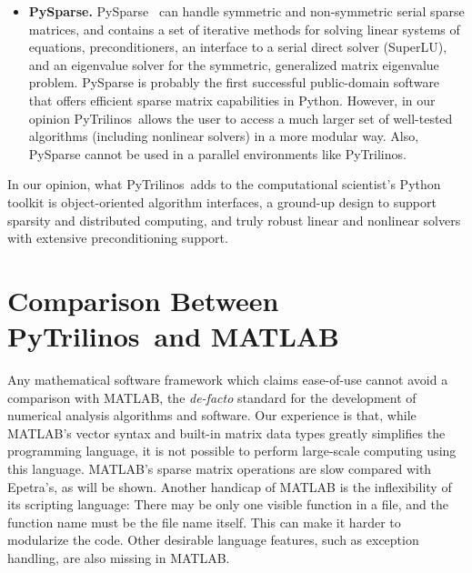 \documentclass[acmtocl]{acmtrans2m}
\newcommand{\PyTrilinos}{{PyTrilinos}}
\begin{document}
\begin{itemize}
  Regarding the serial dense linear algebra modules, both SciPy and
  \PyTrilinos\ define interfaces to optimized LAPACK and BLAS
  routines. However, \PyTrilinos\ offers a wide variety of tools to
  create and use distributed sparse matrices and vectors not supported
  by SciPy.  In our experience, the SciPy capabilities to manage
  sparse matrices are quite limited.  For example, SciPy offers a
  wrapper for one sparse serial direct solver, SuperLU, while
  \PyTrilinos\ can interface with several serial and parallel direct
  solvers through the Amesos module.  In our experience, the nonlinear
  module of SciPy can be used to solve only limited-size problems,
  while the algorithms provided by the NOX modules have been used to
  solve nonlinear PDE problems with up to hundreds of millions of
  unknowns.

\item {\bf PySparse.}  PySparse~\cite{broker05using} can handle
  symmetric and non-symmetric serial sparse matrices, and contains a
  set of iterative methods for solving linear systems of equations,
  preconditioners, an interface to a serial direct solver (SuperLU),
  and an eigenvalue solver for the symmetric, generalized matrix
  eigenvalue problem.  PySparse is probably the first successful
  public-domain software that offers efficient sparse matrix
  capabilities in Python.  However, in our opinion \PyTrilinos\ allows
  the user to access a much larger set of well-tested algorithms
  (including nonlinear solvers) in a more modular way.  Also, PySparse
  cannot be used in a parallel environments like \PyTrilinos.

\end{itemize}

In our opinion, what \PyTrilinos\ adds to the computational scientist's
Python toolkit is object-oriented algorithm interfaces, a ground-up
design to support sparsity and distributed computing, and truly robust
linear and nonlinear solvers with extensive preconditioning support.

\section{Comparison Between \PyTrilinos\ and MATLAB}
\label{sec:comparison_matlab}

Any mathematical software framework which claims ease-of-use cannot
avoid a comparison with MATLAB, the {\sl de-facto} standard for the
development of numerical analysis algorithms and software.  Our
experience is that, while MATLAB's vector syntax and built-in matrix
data types greatly simplifies the programming language, it is not
possible to perform large-scale computing using this language.
MATLAB's sparse matrix operations are slow compared with Epetra's, as
will be shown.  Another handicap of MATLAB is the inflexibility of its
scripting language: There may be only one visible function in a file,
and the function name must be the file name itself.  This can make it
harder to modularize the code.  Other desirable language features,
such as exception handling, are also missing in MATLAB.
\end{document}
